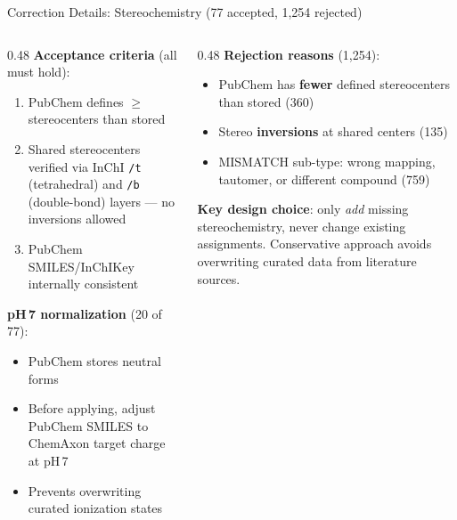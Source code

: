 \documentclass[aspectratio=169,11pt]{beamer}
\begin{document}
\begin{frame}{Correction Details: Stereochemistry (77 accepted, 1,254 rejected)}

\begin{columns}[T]
\begin{column}{0.48\textwidth}
\small
\textbf{Acceptance criteria} (all must hold):
\begin{enumerate}\setlength\itemsep{2pt}
  \item PubChem defines $\geq$ stereocenters than stored
  \item Shared stereocenters verified via InChI
        \texttt{/t} (tetrahedral) and \texttt{/b}
        (double-bond) layers --- no inversions allowed
  \item PubChem SMILES/InChIKey internally consistent
\end{enumerate}

\medskip
\textbf{pH\,7 normalization} (20 of 77):
\begin{itemize}\setlength\itemsep{1pt}
  \item PubChem stores neutral forms
  \item Before applying, adjust PubChem SMILES to
        ChemAxon target charge at pH\,7
  \item Prevents overwriting curated ionization states
\end{itemize}
\end{column}

\begin{column}{0.48\textwidth}
\small
\textbf{Rejection reasons} (1,254):
\begin{itemize}\setlength\itemsep{2pt}
  \item PubChem has \textbf{fewer} defined stereocenters
        than stored (360)
  \item Stereo \textbf{inversions} at shared centers (135)
  \item MISMATCH sub-type: wrong mapping, tautomer,
        or different compound (759)
\end{itemize}

\medskip
\textbf{Key design choice}: only \textit{add} missing
stereochemistry, never change existing assignments.
Conservative approach avoids overwriting curated data
from literature sources.
\end{column}
\end{columns}

\end{frame}
\end{document}
